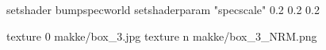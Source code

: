 setshader bumpspecworld
setshaderparam "specscale" 0.2 0.2 0.2

texture 0 makke/box_3.jpg
texture n makke/box_3_NRM.png
